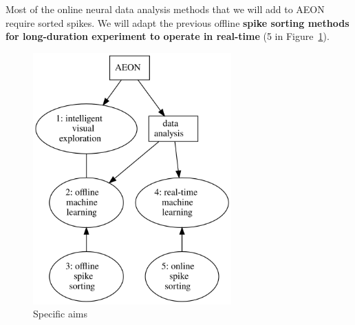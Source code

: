Most of the online neural data analysis methods that we will add to AEON
require sorted spikes. We will adapt the previous offline \textbf{spike sorting
methods for long-duration experiment to operate in real-time} (5 in
Figure~\ref{fig:aims}).

\begin{figure}
    \begin{center}
        \includegraphics[width=3in]{figures/aims.png}
    \end{center}
    \caption{Specific aims}
    \label{fig:aims}
\end{figure}

